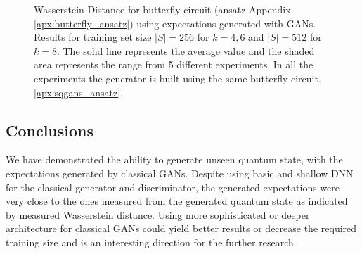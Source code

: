 \begin{figure}[htbp!]
  \captionsetup[subfigure]{labelformat=empty}
  \centering
  \caption{Wasserstein Distance for butterfly circuit (ansatz Appendix
    \ref{apx:butterfly_ansatz}) using expectations generated with GANs. Results
    for training set size $|S| = 256$ for $k=4,6$ and $|S| = 512$ for $k=8$. 
    The solid line represents the average value and the shaded area
    represents the range from 5 different experiments. In all the
    experiments the generator is built using the same butterfly circuit.
    \ref{apx:sqgans_ansatz}. }
  \label{fig:wqgans_res_gans_1}
\end{figure}

\subsection{Conclusions}
We have demonstrated the ability to generate unseen quantum state, with the
expectations generated by classical GANs. Despite using basic and shallow DNN
for the classical generator and discriminator, the generated expectations were
very close to the ones measured from the generated quantum state as indicated by
measured Wasserstein distance. Using more sophisticated or deeper architecture
for classical GANs could yield better results or decrease the required training
size and is an interesting direction for the further research. 

